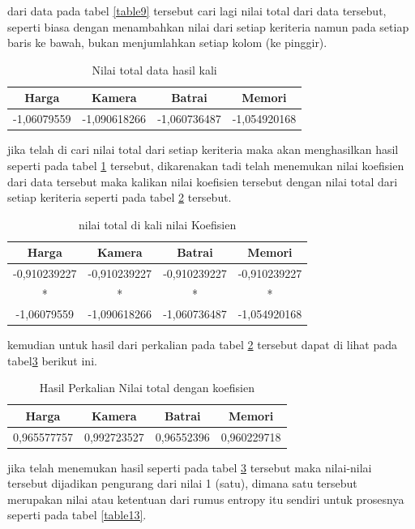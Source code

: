 dari data pada tabel \ref{table9} tersebut cari lagi nilai total dari data tersebut, seperti biasa dengan menambahkan nilai dari setiap keriteria namun pada setiap baris ke bawah, bukan menjumlahkan setiap kolom (ke pinggir). 

\begin{table}[h]
\caption{Nilai total data hasil kali}
\centering
\begin{tabular}{|c|c|c|c|}
\hline
 Harga & Kamera & Batrai&Memori\\
\hline
-1,06079559 & -1,090618266 & -1,060736487 &  -1,054920168\\
\hline
\end{tabular}
\label{table10}
\end{table}

jika telah di cari nilai total dari setiap keriteria maka akan menghasilkan hasil seperti pada tabel \ref{table10} tersebut, dikarenakan tadi telah menemukan nilai koefisien dari data tersebut maka kalikan nilai koefisien tersebut dengan nilai total dari setiap keriteria seperti pada tabel \ref{table11} tersebut.

\begin{table}[h]
\caption{nilai total di kali nilai Koefisien}
\centering
\begin{tabular}{|c|c|c|c|}
\hline
 Harga & Kamera & Batrai&Memori\\
\hline
-0,910239227 & -0,910239227 & -0,910239227 &  -0,910239227\\
\hline
* & * & * &  *\\
\hline
-1,06079559 & -1,090618266 & -1,060736487 &   -1,054920168\\
\hline
\end{tabular}
\label{table11}
\end{table}
\pagebreak
kemudian untuk hasil dari perkalian pada tabel \ref{table11} tersebut dapat di lihat pada tabel\ref{table12} berikut ini.

\begin{table}[h]
\caption{Hasil Perkalian Nilai total dengan koefisien}
\centering
\begin{tabular}{|c|c|c|c|}
\hline
 Harga & Kamera & Batrai&Memori\\
\hline
0,965577757 & 0,992723527 &0,96552396 & 0,960229718\\
\hline
\end{tabular}
\label{table12}
\end{table}

jika telah menemukan hasil seperti pada tabel \ref{table12} tersebut maka nilai-nilai tersebut dijadikan pengurang dari nilai 1 (satu), dimana satu tersebut merupakan nilai atau ketentuan dari rumus entropy itu sendiri untuk prosesnya seperti pada tabel \ref {table13}.


